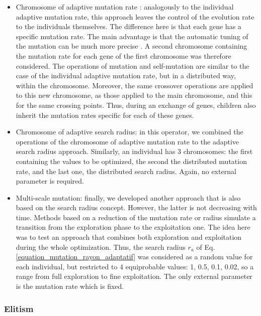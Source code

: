 \documentclass{ametsoc}
\begin{document}
\begin{itemize}
	\item Chromosome of adaptive mutation rate \citep[or \textit{n adaptative mutation rate},][]{Back1992a}: analogously to the individual adaptive mutation rate, this approach leaves the control of the evolution rate to the individuals themselves. The difference here is that each gene has a specific mutation rate. The main advantage is that the automatic tuning of the mutation can be much more precise \citep{Smith1997a}. A second chromosome containing the mutation rate for each gene of the first chromosome was therefore considered. The operations of mutation and self-mutation are similar to the case of the individual adaptive mutation rate, but in a distributed way, within the chromosome. Moreover, the same crossover operations are applied to this new chromosome, as those applied to the main chromosome, and this for the same crossing points. Thus, during an exchange of genes, children also inherit the mutation rates specific for each of these genes.
	
	\item Chromosome of adaptive search radius: in this operator, we combined the operations of the chromosome of adaptive mutation rate to the adaptive search radius approach. Similarly, an individual has 3 chromosomes: the first containing the values to be optimized, the second the distributed mutation rate, and the last one, the distributed search radius. Again, no external parameter is required.
	
	\item Multi-scale mutation: finally, we developed another approach that is also based on the search radius concept. However, the latter is not decreasing with time. Methods based on a reduction of the mutation rate or radius simulate a transition from the exploration phase to the exploitation one. The idea here was to test an approach that combines both exploration and exploitation during the whole optimization. Thus, the search radius $r_{a}$ of Eq. \ref{equation_mutation_rayon_adaptatif} was considered as a random value for each individual, but restricted to 4 equiprobable values: 1, 0.5, 0.1, 0.02, so a range from full exploration to fine exploitation. The only external parameter is the mutation rate which is fixed.
	
\end{itemize}


\subsubsection{Elitism}
\end{document}
